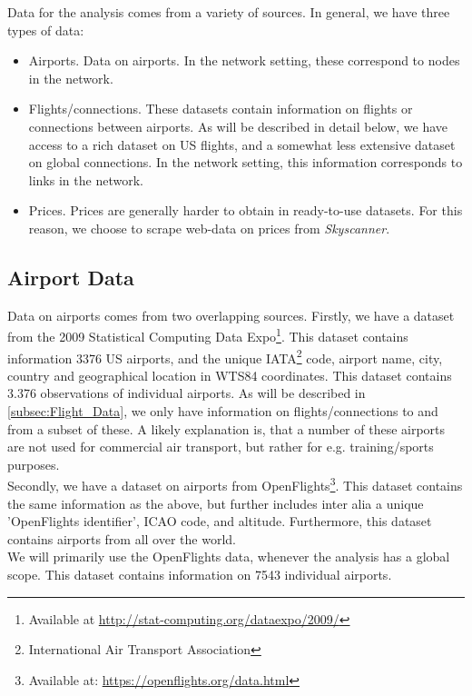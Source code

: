 \label{sec:data}
Data for the analysis comes from a variety of sources. 
In general, we have three types of data: 
\begin{itemize}
    \item Airports. Data on airports. In the network setting, these correspond to nodes in the network.
    \item Flights/connections. These datasets contain information on flights or connections between airports. As will be described in detail below, we have access to a rich dataset on US flights, and a somewhat less extensive dataset on global connections. In the network setting, this information corresponds to links in the network.  
    \item Prices. Prices are generally harder to obtain in ready-to-use datasets. For this reason, we choose to scrape web-data on prices from \textit{Skyscanner}.
\end{itemize}

\subsection{Airport Data}
Data on airports comes from two overlapping sources. Firstly, we have a dataset from the 2009 Statistical Computing Data Expo\footnote{Available at \url{http://stat-computing.org/dataexpo/2009/}}. This dataset contains information 3376 US airports, and the unique IATA\footnote{International Air Transport Association} code, airport name, city, country and geographical location in WTS84 coordinates. This dataset contains 3.376 observations of individual airports. As will be described in \ref{subsec:Flight_Data}, we only have information on flights/connections to and from a subset of these. A likely explanation is, that a number of these airports are not used for commercial air transport, but rather for e.g. training/sports purposes.\\
Secondly, we have a dataset on airports from OpenFlights\footnote{Available at: \url{https://openflights.org/data.html}}. This dataset contains the same information as the above, but further includes inter alia a unique 'OpenFlights identifier', ICAO code, and altitude. Furthermore, this dataset contains airports from all over the world. \\
We will primarily use the OpenFlights data, whenever the analysis has a global scope. This dataset contains information on 7543 individual airports.

